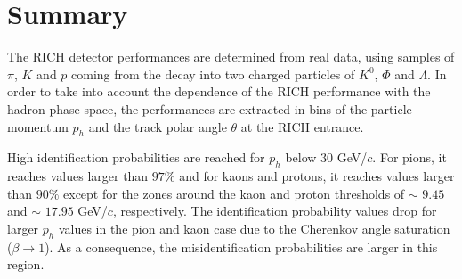 
\newpage

\section{Summary}

The RICH detector performances are determined from real data, using samples of $\pi$, $K$ and $p$ coming from the decay into two charged particles of $K^0$, $\Phi$ and $\Lambda$. In order to take into account the dependence of the RICH performance with the hadron phase-space, the performances are extracted in bins of the particle momentum $p_h$ and the track polar angle $\theta$ at the RICH entrance.

High identification probabilities are reached for $p_h$ below $30$ GeV/$c$. For pions, it reaches values larger than $97\%$ and for kaons and protons, it reaches values larger than $90\%$ except for the zones around the kaon and proton thresholds of $\sim$ $9.45$ and $\sim$ $17.95$ GeV/$c$, respectively. The identification probability values drop for larger $p_h$ values in the pion and kaon case due to the Cherenkov angle saturation ($\beta \rightarrow 1$). As a consequence, the misidentification probabilities are larger in this region.
